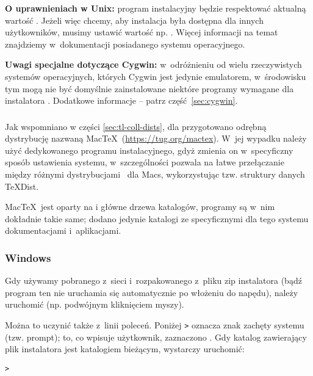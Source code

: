 \documentclass{article}
\begin{document}
\textbf{O  uprawnieniach w Unix:} program instalacyjny
będzie respektować aktualną wartość .
Jeżeli więc chcemy, aby instalacja była dostępna dla innych użytkowników,
musimy ustawić wartość np. . Więcej informacji na temat
 znajdziemy w~dokumentacji posiadanego systemu operacyjnego.

\textbf{Uwagi specjalne dotyczące Cygwin:} w~odróżnieniu od wielu
rzeczywistych systemów operacyjnych, których Cygwin jest jedynie emulatorem,
w~środowisku tym mogą nie być domyślnie zainstalowane niektóre programy
wymagane dla instalatora \TL. Dodatkowe informacje -- patrz
część~\ref{sec:cygwin}.


\subsubsection{\macOS}
\label{sec:macosx}

Jak wspomniano w części \ref{sec:tl-coll-dists}, dla \macOS 
przygotowano odrębną dystrybucję nazwaną Mac\TeX\ (\url{https://tug.org/mactex}).
W~jej wypadku należy użyć dedykowanego programu instalacyjnego, gdyż
zmienia on w~specyficzny sposób ustawienia systemu, w~szczególności pozwala
na łatwe przełączanie między różnymi dystrybucjami \TL\ dla   Macs,  
wykorzystując tzw. struktury danych \TeX{}Dist.

Mac\TeX\ jest oparty na \TL{} i główne drzewa katalogów, programy są
w~nim dokładnie takie same; dodano jedynie katalogi ze specyficznymi dla tego 
systemu  dokumentacjami i~aplikacjami.


 
\subsubsection{Windows}\label{sec:wininst}

Gdy używamy pobranego z~sieci i~rozpakowanego z~pliku zip instalatora
(bądź program ten nie uruchamia się  automatycznie po włożeniu \DVD{}
do napędu), należy uruchomić  (np.
podwójnym kliknięciem myszy). 

Można to uczynić także  z~linii poleceń.  Poniżej \texttt{>} oznacza znak zachęty systemu (tzw. prompt); to,
co wpisuje użytkownik, zaznaczono .
Gdy katalog zawierający plik instalatora
jest katalogiem bieżącym, wystarczy uruchomić:
\begin{alltt}
> 
\end{alltt}
\end{document}
